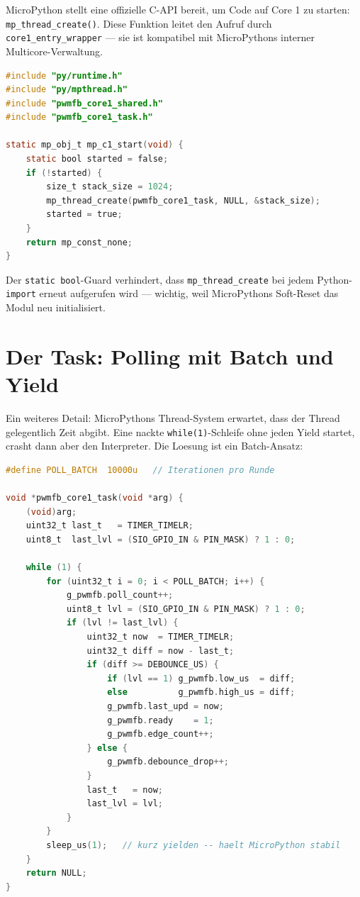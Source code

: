 \documentclass[11pt,a4paper]{article}
\begin{document}
MicroPython stellt eine offizielle C-API bereit, um Code auf Core 1
zu starten: \texttt{mp\_thread\_create()}.
Diese Funktion leitet den Aufruf durch
\texttt{core1\_entry\_wrapper} --- sie ist kompatibel mit MicroPythons
interner Multicore-Verwaltung.

\begin{lstlisting}[language=C, caption={C-Modul: Core 1 sicher starten}]
#include "py/runtime.h"
#include "py/mpthread.h"
#include "pwmfb_core1_shared.h"
#include "pwmfb_core1_task.h"

static mp_obj_t mp_c1_start(void) {
    static bool started = false;
    if (!started) {
        size_t stack_size = 1024;
        mp_thread_create(pwmfb_core1_task, NULL, &stack_size);
        started = true;
    }
    return mp_const_none;
}
\end{lstlisting}

Der \texttt{static bool}-Guard verhindert, dass
\texttt{mp\_thread\_create} bei jedem Python-\texttt{import} erneut
aufgerufen wird --- wichtig, weil MicroPythons Soft-Reset das Modul
neu initialisiert.

\section{Der Task: Polling mit Batch und Yield}

Ein weiteres Detail: MicroPythons Thread-System erwartet,
dass der Thread gelegentlich Zeit abgibt.
Eine nackte \texttt{while(1)}-Schleife ohne jeden Yield
startet, crasht dann aber den Interpreter.
Die Loesung ist ein Batch-Ansatz:

\begin{lstlisting}[language=C, caption={pwmfb\_core1\_task.c --- Batch-Polling mit sleep\_us}]
#define POLL_BATCH  10000u   // Iterationen pro Runde

void *pwmfb_core1_task(void *arg) {
    (void)arg;
    uint32_t last_t   = TIMER_TIMELR;
    uint8_t  last_lvl = (SIO_GPIO_IN & PIN_MASK) ? 1 : 0;

    while (1) {
        for (uint32_t i = 0; i < POLL_BATCH; i++) {
            g_pwmfb.poll_count++;
            uint8_t lvl = (SIO_GPIO_IN & PIN_MASK) ? 1 : 0;
            if (lvl != last_lvl) {
                uint32_t now  = TIMER_TIMELR;
                uint32_t diff = now - last_t;
                if (diff >= DEBOUNCE_US) {
                    if (lvl == 1) g_pwmfb.low_us  = diff;
                    else          g_pwmfb.high_us = diff;
                    g_pwmfb.last_upd = now;
                    g_pwmfb.ready    = 1;
                    g_pwmfb.edge_count++;
                } else {
                    g_pwmfb.debounce_drop++;
                }
                last_t   = now;
                last_lvl = lvl;
            }
        }
        sleep_us(1);   // kurz yielden -- haelt MicroPython stabil
    }
    return NULL;
}
\end{lstlisting}
\end{document}
